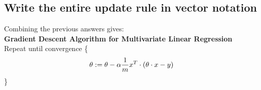 \documentclass{article}
\begin{document}
\subsection{Write the entire update rule in vector notation}
	
	Combining the previous answers gives:\\

	\textbf{Gradient Descent Algorithm for Multivariate Linear Regression}\\
	
	Repeat until convergence \{
	\begin{equation*}
	\theta := \theta - \alpha \frac{1}{m} x^T \cdot (\theta\cdot x - y) \\
	\end{equation*}
	\}\\	
\end{document}
